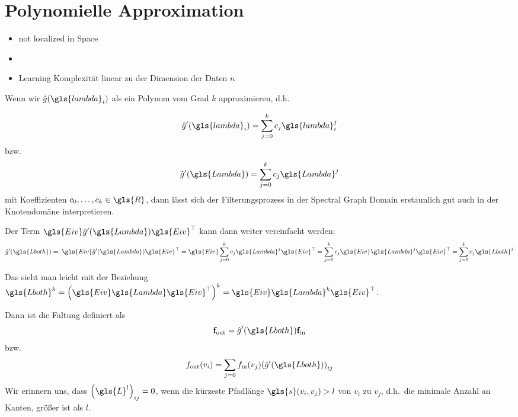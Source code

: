 \section{Polynomielle Approximation}

\begin{itemize}
  \item not localized in Space 
  \item {}
  \item Learning Komplexität linear zu der Dimension der Daten $n$
\end{itemize}

Wenn wir $\hat g\left(\gls{lambda}_i\right)$ als ein Polynom vom Grad $k$ approximieren, d.h.\

\begin{equation}
  \hat g^{\prime}(\gls{lambda}_i) = \sum_{j=0}^k c_j \gls{lambda}_i^j
\end{equation}
bzw.
\begin{equation}
  \hat g^{\prime}\left(\gls{Lambda}\right) = \sum_{j = 0}^k c_j \gls{Lambda}^j
\end{equation}
mit Koeffizienten $c_0, \ldots, c_k \in \gls{R}$, dann lässt sich der Filterungsprozess in der Spectral Graph Domain erstaunlich gut auch in der Knotendomäne interpretieren.

Der Term $\gls{Eiv}\hat g^{\prime}\left(\gls{Lambda}\right)\gls{Eiv}^{\top}$ kann dann weiter vereinfacht werden:
\begin{equation}
  \hat g^{\prime}\left(\gls{Lboth}\right) =: \gls{Eiv}\hat g^{\prime}\left(\gls{Lambda}\right)\gls{Eiv}^{\top} = \gls{Eiv} \sum_{j=0}^k c_j \gls{Lambda}^j \gls{Eiv}^{\top} = \sum_{j=0}^k c_j \gls{Eiv}\gls{Lambda}^j\gls{Eiv}^{\top} = \sum_{j=0}^k c_j \gls{Lboth}^j
\end{equation}

Das sieht man leicht mit der Beziehung $\gls{Lboth}^k = {\left(\gls{Eiv}\gls{Lambda}\gls{Eiv}^{\top}\right)}^k = \gls{Eiv}\gls{Lambda}^k\gls{Eiv}^{\top}$.

Dann ist die Faltung definiert als
\begin{equation}
  \ve{f}_{\mathrm{out}} = \hat g^{\prime}\left(\gls{Lboth}\right)\ve{f}_{\mathrm{in}}
\end{equation}
bzw.
\begin{equation}
  f_{\mathrm{out}}\left(v_i\right) = \sum_{j=0} f_{\mathrm{in}}\left(v_j\right) {\left(\hat g^{\prime}\left(\gls{Lboth}\right)\right)}_{ij}
\end{equation}
Wir erinnern uns, dass ${\left(\gls{L}^l\right)}_{ij} = 0$, wenn die kürzeste Pfadlänge $\gls{s}\left(v_i, v_j\right) > l$ von $v_i$ zu $v_j$, d.h.\ die minimale Anzahl an Kanten, größer ist als $l$.

